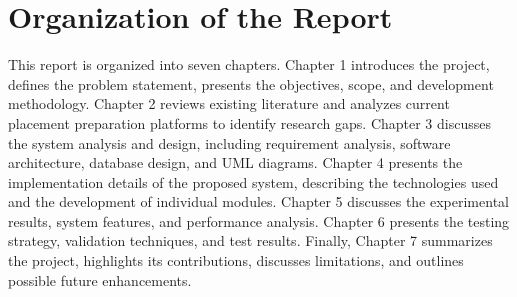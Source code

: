 \section{Organization of the Report}

This report is organized into seven chapters. Chapter 1 introduces the project, defines the problem statement, presents the objectives, scope, and development methodology. Chapter 2 reviews existing literature and analyzes current placement preparation platforms to identify research gaps. Chapter 3 discusses the system analysis and design, including requirement analysis, software architecture, database design, and UML diagrams. Chapter 4 presents the implementation details of the proposed system, describing the technologies used and the development of individual modules. Chapter 5 discusses the experimental results, system features, and performance analysis. Chapter 6 presents the testing strategy, validation techniques, and test results. Finally, Chapter 7 summarizes the project, highlights its contributions, discusses limitations, and outlines possible future enhancements.
